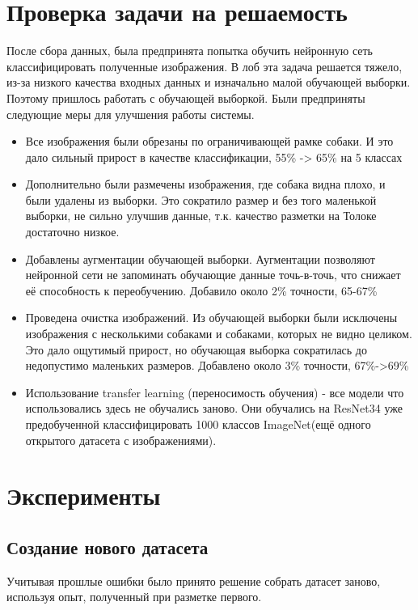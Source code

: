 \section{Проверка задачи на решаемость} \label{sect3_2}
После сбора данных, была предпринята попытка обучить нейронную сеть классифицировать полученные изображения. В лоб эта задача решается тяжело, из-за низкого качества входных данных и изначально малой обучающей выборки. Поэтому пришлось работать с обучающей выборкой. Были предприняты следующие меры для улучшения работы системы.
\begin{itemize}
    \item Все изображения были обрезаны по ограничивающей рамке собаки. И это дало сильный прирост в качестве классификации, 55\% -> 65\% на 5 классах
    \item Дополнительно были размечены изображения, где собака видна плохо, и были удалены из выборки. Это сократило размер и без того маленькой выборки, не сильно улучшив данные, т.к. качество разметки на Толоке достаточно низкое.
    \item Добавлены аугментации обучающей выборки. Аугментации позволяют нейронной сети не запоминать обучающие данные точь-в-точь, что снижает её способность к переобучению. Добавило около 2\% точности, 65-67\%
    \item Проведена очистка изображений. Из обучающей выборки были исключены изображения с несколькими собаками и собаками, которых не видно целиком. Это дало ощутимый прирост, но обучающая выборка сократилась до недопустимо маленьких размеров. Добавлено около 3\% точности, 67\%->69\%
    \item Использование transfer learning (переносимость обучения) - все модели что использовались здесь не обучались заново. Они обучались на ResNet34 уже предобученной классифицировать 1000 классов ImageNet(ещё одного открытого датасета с изображениями).

\end{itemize}
\section{Эксперименты} \label{sect3_3}

\subsection{Создание нового датасета} \label{subsect3_3_1}
Учитывая прошлые ошибки было принято решение собрать датасет заново, используя опыт, полученный при разметке первого.

